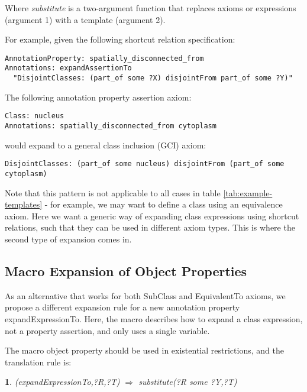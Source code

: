 \documentclass{llncs}
\newtheorem{exprule}{}[section]
\begin{document}
Where \emph{substitute} is a two-argument function that replaces
axioms or expressions (argument 1) with a template (argument 2).

For example, given the following shortcut relation specification:

\begin{verbatim}
AnnotationProperty: spatially_disconnected_from
Annotations: expandAssertionTo 
  "DisjointClasses: (part_of some ?X) disjointFrom part_of some ?Y)"
\end{verbatim}

The following annotation property assertion axiom:

\begin{verbatim}
Class: nucleus
Annotations: spatially_disconnected_from cytoplasm
\end{verbatim}

would expand to a general class inclusion (GCI) axiom:

\begin{verbatim}
DisjointClasses: (part_of some nucleus) disjointFrom (part_of some cytoplasm)
\end{verbatim}

Note that this pattern is not applicable to all cases in table
\ref{tab:example-templates} - for example, we may want to define a
class using an equivalence axiom. Here we want a generic way of
expanding class expressions using shortcut relations, such that they
can be used in different axiom types. This is where the second type of
expansion comes in.

\subsection{Macro Expansion of Object Properties}

As an alternative that works for both SubClass and EquivalentTo
axioms, we propose a different expansion rule for a new annotation
property expandExpressionTo. Here, the macro describes how to expand a class
expression, not a property assertion, and only uses a single variable.

The macro object property should be used in existential restrictions,
and the translation rule is:

\begin{exprule}\label{exp-some}
(expandExpressionTo,?R,?T)  $\Rightarrow$ \newline
substitute(?R some ?Y,?T)
\end{exprule}
\end{document}
